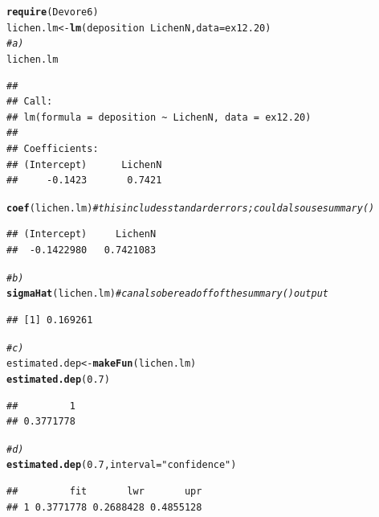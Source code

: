 \documentclass[twoside]{book}
\makeatletter
\newcommand{\hlnum}[1]{\textcolor[rgb]{0.686,0.059,0.569}{#1}}%
\newcommand{\hlstr}[1]{\textcolor[rgb]{0.192,0.494,0.8}{#1}}%
\newcommand{\hlcom}[1]{\textcolor[rgb]{0.678,0.584,0.686}{\textit{#1}}}%
\newcommand{\hlopt}[1]{\textcolor[rgb]{0,0,0}{#1}}%
\newcommand{\hlstd}[1]{\textcolor[rgb]{0.345,0.345,0.345}{#1}}%
\newcommand{\hlkwb}[1]{\textcolor[rgb]{0.69,0.353,0.396}{#1}}%
\newcommand{\hlkwc}[1]{\textcolor[rgb]{0.333,0.667,0.333}{#1}}%
\newcommand{\hlkwd}[1]{\textcolor[rgb]{0.737,0.353,0.396}{\textbf{#1}}}%
\newenvironment{kframe}{%
 \def\at@end@of@kframe{}%
 \ifinner\ifhmode%
  \def\at@end@of@kframe{\end{minipage}}%
  \begin{minipage}{\columnwidth}%
 \fi\fi%
 \def\FrameCommand##1{\hskip\@totalleftmargin \hskip-\fboxsep
 \colorbox{shadecolor}{##1}\hskip-\fboxsep
     \hskip-\linewidth \hskip-\@totalleftmargin \hskip\columnwidth}%
 \MakeFramed {\advance\hsize-\width
   \@totalleftmargin\z@ \linewidth\hsize
   \@setminipage}}%
 {\par\unskip\endMakeFramed%
 \at@end@of@kframe}
\newenvironment{knitrout}{}{} %
\makeatother
\begin{document}
\begin{solution}
\begin{knitrout}
\color{fgcolor}\begin{kframe}
\begin{alltt}
\hlkwd{require}\hlstd{(Devore6)}
\hlstd{lichen.lm} \hlkwb{<-} \hlkwd{lm}\hlstd{(deposition} \hlopt{~} \hlstd{LichenN,} \hlkwc{data} \hlstd{= ex12.20)}
\hlcom{# a)}
\hlstd{lichen.lm}
\end{alltt}
\begin{verbatim}
## 
## Call:
## lm(formula = deposition ~ LichenN, data = ex12.20)
## 
## Coefficients:
## (Intercept)      LichenN  
##     -0.1423       0.7421
\end{verbatim}
\begin{alltt}
\hlkwd{coef}\hlstd{(lichen.lm)}  \hlcom{# this includes standard errors; could also use summary() }
\end{alltt}
\begin{verbatim}
## (Intercept)     LichenN 
##  -0.1422980   0.7421083
\end{verbatim}
\begin{alltt}
\hlcom{# b)}
\hlkwd{sigmaHat}\hlstd{(lichen.lm)}  \hlcom{# can also be read off of the summary() output}
\end{alltt}
\begin{verbatim}
## [1] 0.169261
\end{verbatim}
\begin{alltt}
\hlcom{# c)}
\hlstd{estimated.dep} \hlkwb{<-} \hlkwd{makeFun}\hlstd{(lichen.lm)}
\hlkwd{estimated.dep}\hlstd{(}\hlnum{0.7}\hlstd{)}
\end{alltt}
\begin{verbatim}
##         1 
## 0.3771778
\end{verbatim}
\begin{alltt}
\hlcom{# d)}
\hlkwd{estimated.dep}\hlstd{(}\hlnum{0.7}\hlstd{,} \hlkwc{interval} \hlstd{=} \hlstr{"confidence"}\hlstd{)}
\end{alltt}
\begin{verbatim}
##         fit       lwr       upr
## 1 0.3771778 0.2688428 0.4855128
\end{verbatim}
\end{kframe}
\end{knitrout}
\end{solution}
\end{document}
